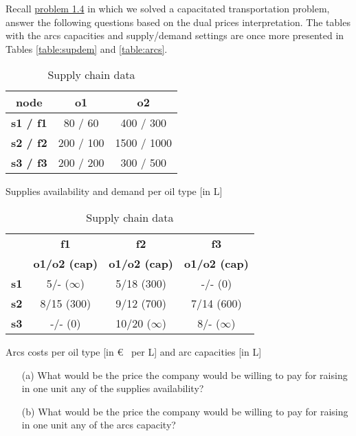 Recall \href{https://mycourses.aalto.fi/mod/folder/view.php?id=651668}{problem 1.4} in which we solved a capacitated transportation problem, answer the following questions based on the dual prices interpretation. The tables with the arcs capacities and supply/demand settings are once more presented in Tables \ref{table:supdem} and \ref{table:arcs}.

\begin{table}[h!]
	\begin{subtable}[h]{0.4\textwidth}
		\begin{center}
			\begin{tabular}{c|cc}
				\textbf{node} & \textbf{o1} & \textbf{o2} \\
				\hline
				\textbf{s1 / f1} & 80 / 60 & 400 / 300 \\
				\textbf{s2 / f2} & 200 / 100 & 1500 / 1000 \\
				\textbf{s3 / f3} & 200 / 200 & 300 / 500 \\
			\end{tabular}
		\end{center}
		\caption{Supplies availability and demand per oil type [in L]}
		\label{table:supdem}
	\end{subtable}
	\hfill
	\begin{subtable}[h]{0.55\textwidth}
		\begin{center}
			\begin{tabular}{c|ccc}
				& \textbf{f1} & \textbf{f2} & \textbf{f3}\\
				& \textbf{o1/o2 (cap)} & \textbf{o1/o2 (cap)} & \textbf{o1/o2 (cap)}\\
				\hline
				\textbf{s1} & 5/- ($\infty$) & 5/18 (300) & -/- (0)\\
				\textbf{s2} & 8/15 (300) & 9/12 (700) & 7/14 (600)\\
				\textbf{s3} & -/- (0) & 10/20 ($\infty$) & 8/- ($\infty$)\\
			\end{tabular}
		\end{center}
		\caption{Arcs costs per oil type [in \euro~ per L] and arc capacities [in L]}
		\label{table:arcs}
	\end{subtable}
	\caption{Supply chain data}
	\label{table:sc}
\end{table}
%
\begin{itemize}
	\item [(a)] What would be the price the company would be willing to pay for raising in one unit any of the supplies availability?

	\item [(b)] What would be the price the company would be willing to pay for raising in one unit any of the arcs capacity?	
\end{itemize}